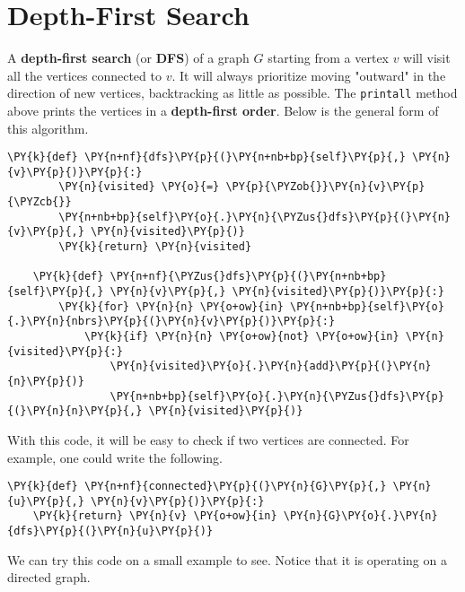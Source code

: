 \section{Depth-First Search}


A \textbf{depth-first search} (or \textbf{DFS}) of a graph $G$ starting from a vertex $v$ will visit all the vertices connected to $v$.
It will always prioritize moving "outward" in the direction of new vertices, backtracking as little as possible.
The \texttt{printall} method above prints the vertices in a \textbf{depth-first order}.
Below is the general form of this algorithm.

\begin{Verbatim}[commandchars=\\\{\}]
    \PY{k}{def} \PY{n+nf}{dfs}\PY{p}{(}\PY{n+nb+bp}{self}\PY{p}{,} \PY{n}{v}\PY{p}{)}\PY{p}{:}
        \PY{n}{visited} \PY{o}{=} \PY{p}{\PYZob{}}\PY{n}{v}\PY{p}{\PYZcb{}}
        \PY{n+nb+bp}{self}\PY{o}{.}\PY{n}{\PYZus{}dfs}\PY{p}{(}\PY{n}{v}\PY{p}{,} \PY{n}{visited}\PY{p}{)}
        \PY{k}{return} \PY{n}{visited}

    \PY{k}{def} \PY{n+nf}{\PYZus{}dfs}\PY{p}{(}\PY{n+nb+bp}{self}\PY{p}{,} \PY{n}{v}\PY{p}{,} \PY{n}{visited}\PY{p}{)}\PY{p}{:}
        \PY{k}{for} \PY{n}{n} \PY{o+ow}{in} \PY{n+nb+bp}{self}\PY{o}{.}\PY{n}{nbrs}\PY{p}{(}\PY{n}{v}\PY{p}{)}\PY{p}{:}
            \PY{k}{if} \PY{n}{n} \PY{o+ow}{not} \PY{o+ow}{in} \PY{n}{visited}\PY{p}{:}
                \PY{n}{visited}\PY{o}{.}\PY{n}{add}\PY{p}{(}\PY{n}{n}\PY{p}{)}
                \PY{n+nb+bp}{self}\PY{o}{.}\PY{n}{\PYZus{}dfs}\PY{p}{(}\PY{n}{n}\PY{p}{,} \PY{n}{visited}\PY{p}{)}
\end{Verbatim}



With this code, it will be easy to check if two vertices are connected.
For example, one could write the following.

\begin{Verbatim}[commandchars=\\\{\}]
\PY{k}{def} \PY{n+nf}{connected}\PY{p}{(}\PY{n}{G}\PY{p}{,} \PY{n}{u}\PY{p}{,} \PY{n}{v}\PY{p}{)}\PY{p}{:}
    \PY{k}{return} \PY{n}{v} \PY{o+ow}{in} \PY{n}{G}\PY{o}{.}\PY{n}{dfs}\PY{p}{(}\PY{n}{u}\PY{p}{)}
\end{Verbatim}



We can try this code on a small example to see.
Notice that it is operating on a directed graph.

